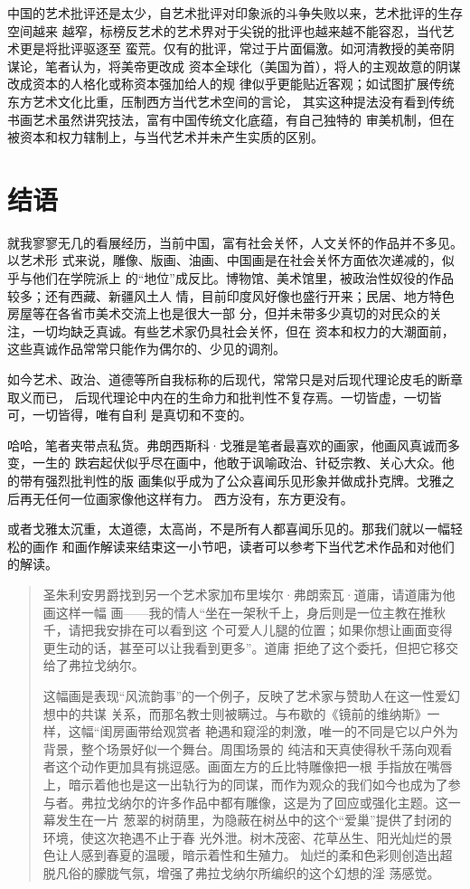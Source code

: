 中国的艺术批评还是太少，自艺术批评对印象派的斗争失败以来，艺术批评的生存空间越来
越窄，标榜反艺术的艺术界对于尖锐的批评也越来越不能容忍，当代艺术更是将批评驱逐至
蛮荒。仅有的批评，常过于片面偏激。如河清教授的美帝阴谋论，笔者认为，将美帝更改成
资本全球化（美国为首），将人的主观故意的阴谋改成资本的人格化或称资本强加给人的规
律似乎更能贴近客观；如试图扩展传统东方艺术文化比重，压制西方当代艺术空间的言论，
其实这种提法没有看到传统书画艺术虽然讲究技法，富有中国传统文化底蕴，有自己独特的
审美机制，但在被资本和权力辖制上，与当代艺术并未产生实质的区别。


\section{结语}

就我寥寥无几的看展经历，当前中国，富有社会关怀，人文关怀的作品并不多见。以艺术形
式来说，雕像、版画、油画、中国画是在社会关怀方面依次递减的，似乎与他们在学院派上
的“地位”成反比。博物馆、美术馆里，被政治性奴役的作品较多；还有西藏、新疆风土人
情，目前印度风好像也盛行开来；民居、地方特色房屋等在各省市美术交流上也是很大一部
分，但并未带多少真切的对民众的关注，一切均缺乏真诚。有些艺术家仍具社会关怀，但在
资本和权力的大潮面前，这些真诚作品常常只能作为偶尔的、少见的调剂。

如今艺术、政治、道德等所自我标称的后现代，常常只是对后现代理论皮毛的断章取义而已，
后现代理论中内在的生命力和批判性不复存焉。一切皆虚，一切皆可，一切皆得，唯有自利
是真切和不变的。

哈哈，笔者夹带点私货。弗朗西斯科·戈雅是笔者最喜欢的画家，他画风真诚而多变，一生的
跌宕起伏似乎尽在画中，他敢于讽喻政治、针砭宗教、关心大众。他的带有强烈批判性的版
画集似乎成为了公众喜闻乐见形象并做成扑克牌。戈雅之后再无任何一位画家像他这样有力。
西方没有，东方更没有。

或者戈雅太沉重，太道德，太高尚，不是所有人都喜闻乐见的。那我们就以一幅轻松的画作
和画作解读来结束这一小节吧，读者可以参考下当代艺术作品和对他们的解读。

\begin{quotation}

  圣朱利安男爵找到另一个艺术家加布里埃尔·弗朗索瓦·道庸，请道庸为他画这样一幅
  画——我的情人“坐在一架秋千上，身后则是一位主教在推秋千，请把我安排在可以看到这
  个可爱人儿腿的位置；如果你想让画面变得更生动的话，甚至可以让我看到更多”。道庸
  拒绝了这个委托，但把它移交给了弗拉戈纳尔。

  这幅画是表现“风流韵事”的一个例子，反映了艺术家与赞助人在这一性爱幻想中的共谋
  关系，而那名教士则被瞒过。与布歇的《镜前的维纳斯》一样，这幅“闺房画带给观赏者
  艳遇和窥淫的刺激，唯一的不同是它以户外为背景，整个场景好似一个舞台。周围场景的
  纯洁和天真使得秋千荡向观看者这个动作更加具有挑逗感。画面左方的丘比特雕像把一根
  手指放在嘴唇上，暗示着他也是这一出轨行为的同谋，而作为观众的我们如今也成为了参
  与者。弗拉戈纳尔的许多作品中都有雕像，这是为了回应或强化主题。这一幕发生在一片
  葱翠的树荫里，为隐蔽在树丛中的这个“爱巢”提供了封闭的环境，使这次艳遇不止于春
  光外泄。树木茂密、花草丛生、阳光灿烂的景色让人感到春夏的温暖，暗示着性和生殖力。
  灿烂的柔和色彩则创造出超脱凡俗的朦胧气氛，增强了弗拉戈纳尔所编织的这个幻想的淫
  荡感觉。

\end{quotation}

